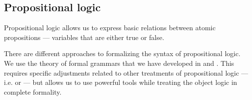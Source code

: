 \subsection{Propositional logic}\label{subsec:propositional_logic}

Propositional logic allows us to express basic relations between atomic propositions --- variables that are either true or false.

\begin{remark}\label{rem:propositional_syntax_and_grammars}
  There are different approaches to formalizing the syntax of propositional logic. We use the theory of formal grammars that we have developed in  and . This requires specific adjustments related to other treatments of propositional logic --- i.e. \cite[ch. 2]{Wasilewska2018} or \cite[ch. 1]{VanDalen2004} --- but allows us to use powerful tools while treating the object logic in complete formality.
\end{remark}

